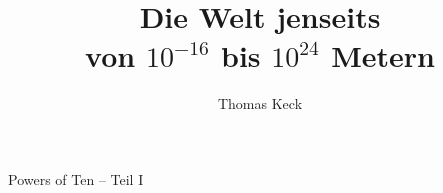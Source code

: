 \documentclass[14pt]{beamer}
\begin{document}
%
	\author{Thomas Keck}
	\title{Die Welt jenseits \\von $10^{-16}$ bis $10^{24}$ Metern}
	\frame[plain]{\maketitle}
	
	\begin{frame}
		\centering
		\huge{Powers of Ten -- Teil I}
	\end{frame}
\end{document}
